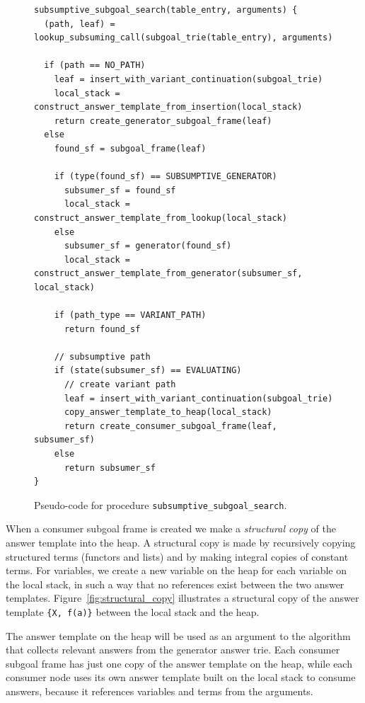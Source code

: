 \begin{figure}[ht]
\begin{Verbatim}
subsumptive_subgoal_search(table_entry, arguments) {
  (path, leaf) = lookup_subsuming_call(subgoal_trie(table_entry), arguments)
  
  if (path == NO_PATH)
    leaf = insert_with_variant_continuation(subgoal_trie)
    local_stack = construct_answer_template_from_insertion(local_stack)
    return create_generator_subgoal_frame(leaf)
  else
    found_sf = subgoal_frame(leaf)
    
    if (type(found_sf) == SUBSUMPTIVE_GENERATOR)
      subsumer_sf = found_sf
      local_stack = construct_answer_template_from_lookup(local_stack)
    else
      subsumer_sf = generator(found_sf)
      local_stack = construct_answer_template_from_generator(subsumer_sf, local_stack)
    
    if (path_type == VARIANT_PATH)
      return found_sf
    
    // subsumptive path
    if (state(subsumer_sf) == EVALUATING)
      // create variant path
      leaf = insert_with_variant_continuation(subgoal_trie)
      copy_answer_template_to_heap(local_stack)
      return create_consumer_subgoal_frame(leaf, subsumer_sf)
    else
      return subsumer_sf
}
\end{Verbatim}
\caption{Pseudo-code for procedure \texttt{subsumptive\_subgoal\_search}.}
\label{fig:subsumptive_subgoal_search}
\end{figure}

When a consumer subgoal frame is created we make a \textit{structural copy} of the answer template
into the heap. A structural copy is made by recursively copying structured terms (functors and lists)
and by making integral copies of constant terms.
For variables, we create a new variable on the heap for each variable on the local stack, in such a way
that no references exist between the two answer templates.
Figure~\ref{fig:structural_copy} illustrates a structural copy of the answer template
\texttt{\{X,~f(a)\}} between the local stack and the heap.

The answer template on the heap will be used as an argument
to the algorithm that collects relevant answers from the generator answer trie.
Each consumer subgoal frame has just one copy of the answer template on the heap,
while each consumer node uses its own answer template built on the local stack to
consume answers, because it references variables
and terms from the arguments.

